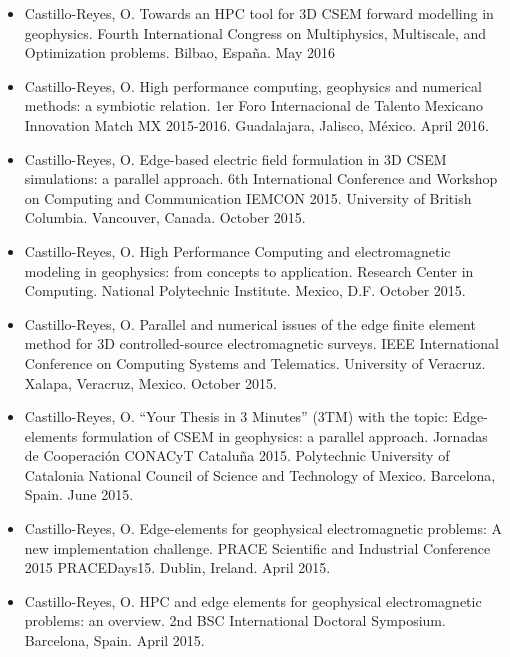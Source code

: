 \documentclass[letterpaper,10pt,english]{sphinxmanual}
\begin{document}
\begin{itemize}
\item {} 
Castillo-Reyes, O. Towards an HPC tool for 3D CSEM forward modelling in geophysics. Fourth International Congress on Multiphysics, Multiscale, and Optimization problems. Bilbao, España. May 2016

\item {} 
Castillo-Reyes, O. High performance computing, geophysics and numerical methods: a symbiotic relation. 1er Foro Internacional de Talento Mexicano \textendash{} Innovation Match MX 2015-2016. Guadalajara, Jalisco, México. April 2016.

\item {} 
Castillo-Reyes, O. Edge-based electric field formulation in 3D CSEM simulations: a parallel approach. 6th International Conference and Workshop on Computing and Communication \textendash{} IEMCON \textendash{} 2015. University of British Columbia. Vancouver, Canada. October 2015.

\item {} 
Castillo-Reyes, O. High Performance Computing and electromagnetic modeling in geophysics: from concepts to application. Research Center in Computing. National Polytechnic Institute. Mexico, D.F. October 2015.

\item {} 
Castillo-Reyes, O. Parallel and numerical issues of the edge finite element method for 3D controlled-source electromagnetic surveys. IEEE International Conference on Computing Systems and Telematics. University of Veracruz. Xalapa, Veracruz, Mexico. October 2015.

\item {} 
Castillo-Reyes, O. “Your Thesis in 3 Minutes” (3TM) with the topic: Edge-elements formulation of CSEM in geophysics: a parallel approach. Jornadas de Cooperación CONACyT \textendash{} Cataluña 2015. Polytechnic University of Catalonia \textendash{} National Council of Science and Technology of Mexico. Barcelona, Spain. June 2015.

\item {} 
Castillo-Reyes, O. Edge-elements for geophysical electromagnetic problems: A new implementation challenge. PRACE Scientific and Industrial Conference 2015 \textendash{} PRACEDays15. Dublin, Ireland. April 2015.

\item {} 
Castillo-Reyes, O. HPC and edge elements for geophysical electromagnetic problems: an overview. 2nd BSC International Doctoral Symposium. Barcelona, Spain. April 2015.


\end{itemize}
\end{document}
